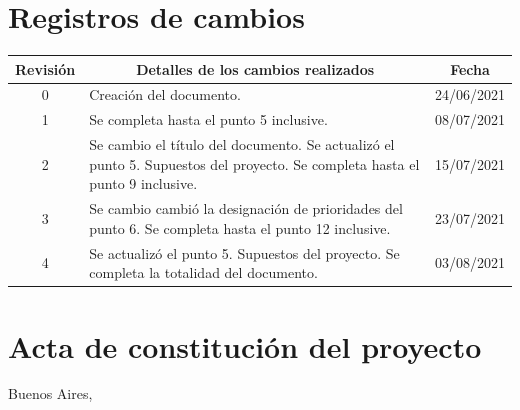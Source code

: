 \documentclass[
11pt, %
codirector, %
]{charter}
\begin{document}
\maketitle
\thispagestyle{empty}
\pagebreak


\thispagestyle{empty}
{\setlength{\parskip}{0pt}
\tableofcontents{}
}
\pagebreak


\section*{Registros de cambios}
\label{sec:registro}


\begin{table}[ht]
\label{tab:registro}
\centering
\begin{tabularx}{\linewidth}{@{}|c|X|c|@{}}
\hline
\rowcolor[HTML]{C0C0C0} 
Revisión & \multicolumn{1}{c|}{\cellcolor[HTML]{C0C0C0}Detalles de los cambios realizados} & Fecha      \\ \hline
0      & Creación del documento.                                 &24/06/2021\\ \hline
1      & Se completa hasta el punto 5 inclusive.                 & 08/07/2021 \\ \hline
2      & Se cambio el título del documento.\newline
		 Se actualizó el punto 5. Supuestos del proyecto.\newline  
		 Se completa hasta el punto 9 inclusive.      		      & 15/07/2021 \\ \hline
3     & Se cambio cambió la designación de prioridades del punto 6.\newline 
		 Se completa hasta el punto 12 inclusive.      		      & 23/07/2021 \\ \hline
4     & Se actualizó el punto 5. Supuestos del proyecto.\newline 
		 Se completa la totalidad del documento.      		      & 03/08/2021 \\ \hline
\end{tabularx}
\end{table}

\pagebreak



\section*{Acta de constitución del proyecto}
\label{sec:acta}

\begin{flushright}
Buenos Aires, \fechaInicioName
\end{flushright}
\end{document}
